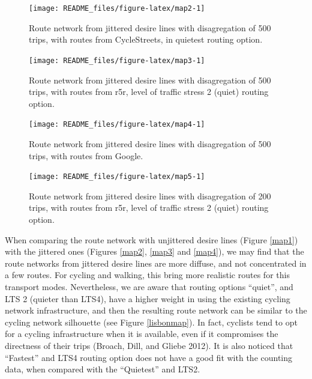 \documentclass{isprs} %
\begin{document}
\begin{figure}

{\centering \texttt{[image: README\_files/figure-latex/map2-1]} 

}

\caption{\label{map2}Route network from jittered desire lines with disagregation of 500 trips, with routes from CycleStreets, in quietest routing option.}\label{fig:map2}
\end{figure}

\begin{figure}

{\centering \texttt{[image: README\_files/figure-latex/map3-1]} 

}

\caption{\label{map3}Route network from jittered desire lines with disagregation of 500 trips, with routes from r5r, level of traffic stress 2 (quiet) routing option.}\label{fig:map3}
\end{figure}

\begin{figure}

{\centering \texttt{[image: README\_files/figure-latex/map4-1]} 

}

\caption{\label{map4}Route network from jittered desire lines with disagregation of 500 trips, with routes from Google.}\label{fig:map4}
\end{figure}

\begin{figure}

{\centering \texttt{[image: README\_files/figure-latex/map5-1]} 

}

\caption{\label{map5}Route network from jittered desire lines with disagregation of 200 trips, with routes from r5r, level of traffic stress 2 (quiet) routing option.}\label{fig:map5}
\end{figure}

When comparing the route network with unjittered desire lines (Figure \ref{map1}) with the jittered ones (Figures \ref{map2}, \ref{map3} and \ref{map4}), we may find that the route networks from jittered desire lines are more diffuse, and not concentrated in a few routes. For cycling and walking, this bring more realistic routes for this transport modes. Nevertheless, we are aware that routing options ``quiet'', and LTS 2 (quieter than LTS4), have a higher weight in using the existing cycling network infrastructure, and then the resulting route network can be similar to the cycling network silhouette (see Figure \ref{lisbonmap}). In fact, cyclists tend to opt for a cycling infrastructure when it is available, even if it compromises the directness of their trips (Broach, Dill, and Gliebe 2012).
It is also noticed that ``Fastest'' and LTS4 routing option does not have a good fit with the counting data, when compared with the ``Quietest'' and LTS2.
\end{document}
